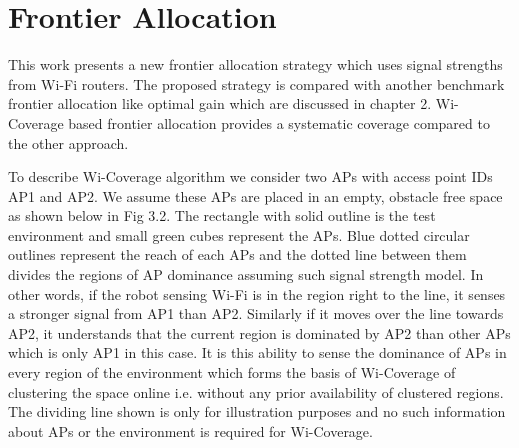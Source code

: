 \section{Frontier Allocation}
This work presents a new frontier allocation strategy which uses signal strengths from Wi-Fi routers. The proposed strategy is compared with another benchmark frontier allocation like optimal gain which are discussed in chapter 2. Wi-Coverage based frontier allocation provides a systematic coverage compared to the other approach.

\par To describe Wi-Coverage algorithm we consider two APs with access point IDs AP1 and AP2. We assume these APs are placed in an empty, obstacle free space as shown below in Fig 3.2. The rectangle with solid outline is the test environment and small green cubes represent the APs. Blue dotted circular outlines represent the reach of each APs and the dotted line between them divides the regions of AP dominance assuming such signal strength model. In other words, if the robot sensing Wi-Fi is in the region right to the line, it senses a stronger signal from AP1 than AP2. Similarly if it moves over the line towards AP2, it understands that the current region is dominated by AP2 than other APs which is only AP1 in this case. It is this ability to sense the dominance of APs in every region of the environment which forms the basis of Wi-Coverage of clustering the space online i.e. without any prior availability of clustered regions. The dividing line shown is only for illustration purposes and no such information about APs or the environment is required for Wi-Coverage. 

